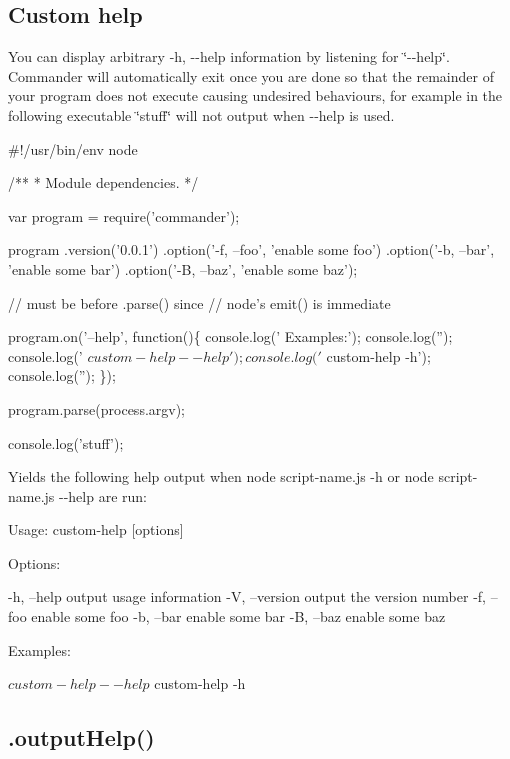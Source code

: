 \subsection*{Custom help}

You can display arbitrary {\ttfamily -\/h, -\/-\/help} information by listening for \char`\"{}-\/-\/help\char`\"{}. Commander will automatically exit once you are done so that the remainder of your program does not execute causing undesired behaviours, for example in the following executable \char`\"{}stuff\char`\"{} will not output when {\ttfamily -\/-\/help} is used.


\begin{DoxyCode}
#!/usr/bin/env node

/**
 * Module dependencies.
 */

var program = require('commander');

program
  .version('0.0.1')
  .option('-f, --foo', 'enable some foo')
  .option('-b, --bar', 'enable some bar')
  .option('-B, --baz', 'enable some baz');

// must be before .parse() since
// node's emit() is immediate

program.on('--help', function()\{
  console.log('  Examples:');
  console.log('');
  console.log('    $ custom-help --help');
  console.log('    $ custom-help -h');
  console.log('');
\});

program.parse(process.argv);

console.log('stuff');
\end{DoxyCode}


Yields the following help output when {\ttfamily node script-\/name.\+js -\/h} or {\ttfamily node script-\/name.\+js -\/-\/help} are run\+:


\begin{DoxyCode}
Usage: custom-help [options]

Options:

  -h, --help     output usage information
  -V, --version  output the version number
  -f, --foo      enable some foo
  -b, --bar      enable some bar
  -B, --baz      enable some baz

Examples:

  $ custom-help --help
  $ custom-help -h
\end{DoxyCode}


\subsection*{.output\+Help()}

